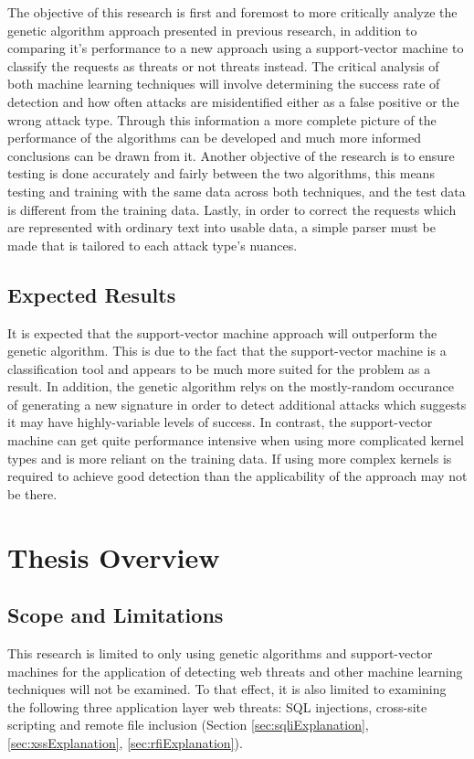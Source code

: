The objective of this research is first and foremost to more critically analyze the genetic algorithm approach presented in previous research, in addition to comparing it's performance to a new approach using a support-vector machine to classify the requests as threats or not threats instead.  The critical analysis of both machine learning techniques will involve determining the success rate of detection and how often attacks are misidentified either as a false positive or the wrong attack type.  Through this information a more complete picture of the performance of the algorithms can be developed and much more informed conclusions can be drawn from it.  Another objective of the research is to ensure testing is done accurately and fairly between the two algorithms, this means testing and training with the same data across both techniques, and the test data is different from the training data.  Lastly, in order to correct the requests which are represented with ordinary text into usable data, a simple parser must be made that is tailored to each attack type's nuances.

\subsection{Expected Results}\label{sec:expResults}

It is expected that the support-vector machine approach will outperform the genetic algorithm.  This is due to the fact that the support-vector machine is a classification tool and appears to be much more suited for the problem as a result.  In addition, the genetic algorithm relys on the mostly-random occurance of generating a new signature in order to detect additional attacks which suggests it may have highly-variable levels of success.  In contrast, the support-vector machine can get quite performance intensive when using more complicated kernel types and is more reliant on the training data.  If using more complex kernels is required to achieve good detection than the applicability of the approach may not be there.

\section{Thesis Overview}
\subsection{Scope and Limitations}\label{sec:scope}
This research is limited to only using genetic algorithms and support-vector machines for the application of detecting web threats and other machine learning techniques will not be examined.  To that effect, it is also limited to examining the following three application layer web threats: SQL injections, cross-site scripting and remote file inclusion (Section \ref{sec:sqliExplanation}, \ref{sec:xssExplanation}, \ref{sec:rfiExplanation}).  

